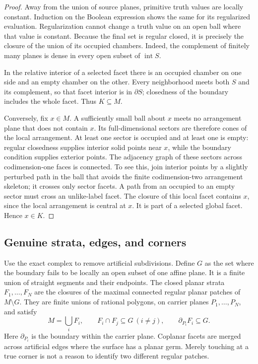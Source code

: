 \documentclass[11pt]{article}
\theoremstyle{definition}
\theoremstyle{remark}
\newcommand{\intr}{\operatorname{int}}
\begin{document}
\begin{proof}
Away from the union of source planes, primitive truth values are locally
constant. Induction on the Boolean expression shows the same for its
regularized evaluation. Regularization cannot change a truth value on an
open ball where that value is constant. Because the final set is regular
closed, it is precisely the closure of the union of its occupied chambers.
Indeed, the complement of finitely many planes is dense in every open
subset of $\intr S$.

In the relative interior of a selected facet there is an occupied chamber
on one side and an empty chamber on the other. Every neighborhood meets
both $S$ and its complement, so that facet interior is in $\partial S$;
closedness of the boundary includes the whole facet. Thus $K\subseteq M$.

Conversely, fix $x\in M$. A sufficiently small ball about $x$ meets no
arrangement plane that does not contain $x$. Its full-dimensional sectors
are therefore cones of the local arrangement. At least one sector is
occupied and at least one is empty: regular closedness supplies interior
solid points near $x$, while the boundary condition supplies exterior
points. The adjacency graph of these sectors across codimension-one faces
is connected. To see this, join interior points by a slightly perturbed
path in the ball that avoids the finite codimension-two arrangement
skeleton; it crosses only sector facets. A path from an occupied to an
empty sector must cross an unlike-label facet. The closure of this local
facet contains $x$, since the local arrangement is central at $x$.
It is part of a selected global facet. Hence $x\in K$.
\end{proof}

\subsection{Genuine strata, edges, and corners}
\label{sec:features}

Use the exact complex to remove artificial subdivisions. Define $G$ as
the set where the boundary fails to be locally an open subset of one
affine plane. It is a finite union of straight segments and their endpoints.
The closed planar strata $F_1,\ldots,F_N$ are the closures of the maximal
connected regular planar patches of $M\setminus G$. They are finite unions
of rational polygons, on carrier planes $P_1,\ldots,P_N$, and satisfy
\[
  M=\bigcup_i F_i,\qquad
  F_i\cap F_j\subseteq G\ (i\ne j),\qquad
  \partial_{P_i}F_i\subseteq G. \tag{2}\label{eq:strata}
\]
Here $\partial_{P_i}$ is the boundary within the carrier plane. Coplanar
facets are merged across artificial edges where the surface has a planar
germ. Merely touching at a true corner is not a reason to identify two
different regular patches.
\end{document}
